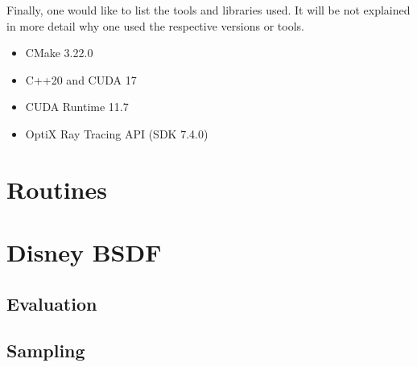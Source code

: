 Finally, one would like to list the tools and libraries used.
It will be not explained in more detail why one used the respective versions or tools.

\begin{itemize}
    \item CMake 3.22.0
    \item C++20 and CUDA 17
    \item CUDA Runtime 11.7
    \item OptiX Ray Tracing API (SDK 7.4.0)
\end{itemize}

\section{Routines}

\section{Disney BSDF}

\subsection{Evaluation}

\subsection{Sampling}